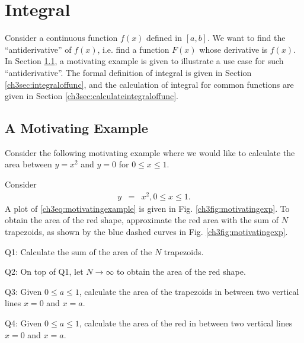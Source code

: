 \chapter{Integral} \label{ch3}

Consider a continuous function $f(x)$ defined in $[a, b]$. We want to find the ``antiderivative'' of $f(x)$, i.e. find a function $F(x)$ whose derivative is $f(x)$. In Section \ref{ch3section:motivatingexample}, a motivating example is given to illustrate a use case for such ``antiderivative''. The formal definition of integral is given in Section \ref{ch3sec:integraloffunc}, and the calculation of integral for common functions are given in Section \ref{ch3sec:calculateintegraloffunc}.

\section{A Motivating Example} \label{ch3section:motivatingexample}

Consider the following motivating example where we would like to calculate the area between $y=x^2$ and $y=0$ for $0 \leq x \leq 1$.

\begin{shortbox}

Consider
\begin{eqnarray}
    y &=& x^2, 0 \leq x \leq 1. \label{ch3eq:motivatingexample}
\end{eqnarray}
A plot of \eqref{ch3eq:motivatingexample} is given in Fig. \ref{ch3fig:motivatingexp}. To obtain the area of the red shape, approximate the red area with the sum of $N$ trapezoids, as shown by the blue dashed curves in Fig. \ref{ch3fig:motivatingexp}.

Q1:  Calculate the sum of the area of the $N$ trapezoids.

Q2: On top of Q1, let $N \rightarrow \infty$ to obtain the area of the red shape.

Q3: Given $0 \leq a \leq 1$, calculate the area of the trapezoids in between two vertical lines $x=0$ and $x=a$.

Q4: Given $0 \leq a \leq 1$, calculate the area of the red in between two vertical lines $x=0$ and $x=a$.

\end{shortbox}

